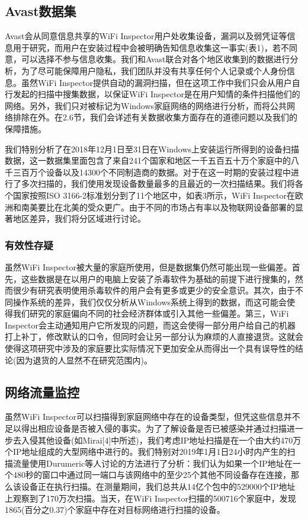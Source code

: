 \documentclass[UTF8]{ctexart}
\begin{document}
	\subsection{Avast数据集}
	Avast会从同意信息共享的WiFi Inspector用户处收集设备，漏洞以及弱凭证等信息用于研究，而用户在安装过程中会被明确告知信息收集这一事实(表1)，若不同意，可以选择不参与信息收集。我们和Avast联合对各个地区收集到的数据进行分析，为了尽可能保障用户隐私，我们团队并没有共享任何个人记录或个人身份信息。虽然WiFi Inspector提供自动的漏洞扫描，但在这项工作中我们只会从用户自行发起的扫描中搜集数据，以保证WiFi Inspector是在用户知情的条件扫描他们的网络。另外，我们只对被标记为Windows家庭网络的网络进行分析，而将公共网络排除在外。在2.6节，我们会详述有关数据收集方面存在的道德问题以及我们的保障措施。
	
	我们特别分析了在2018年12月1日至31日在Windows上安装运行所得到的设备扫描数据，这一数据集里面包含了来自241个国家和地区一千五百五十万个家庭中的八千三百万个设备以及14300个不同制造商的数据。对于在这一时期的安装过程中进行了多次扫描的，我们使用发现设备数量最多的且最近的一次扫描结果。我们将各个国家按照ISO 3166-2标准划分到了11个地区中，如表3所示，WiFi Inspector在欧洲和南美要比在北美的受众更广。由于不同的市场占有率以及物联网设备部署的显著地区差异，我们将分区域进行讨论。
	
	\subsubsection*{有效性存疑}
	虽然WiFi Inspector被大量的家庭所使用，但是数据集仍然可能出现一些偏差。首先，这些数据是在以用户的电脑上安装了杀毒软件为基础的前提下进行搜集的，然而很少有研究表明使用杀毒软件的用户会有更多或更少的安全意识。其次，由于不同操作系统的差异，我们仅仅分析从Windows系统上得到的数据，而这可能会使得我们研究的家庭偏向不同的社会经济群体或引入其他一些偏差。第三，WiFi Inspector会主动通知用户它所发现的问题，而这会使得一部分用户给自己的机器打上补丁，修改默认的口令，但同时会让另一部分认为麻烦的人直接退货。这就会使得这项研究中涉及的家庭要比实际情况下更加安全从而得出一个具有误导性的结论(因为退货的人显然不在研究范围内)。
	
	\subsection{网络流量监控}
	虽然WiFi Inspector可以扫描得到家庭网络中存在的设备类型，但凭这些信息并不足以得出相应设备是否被入侵的事实。为了了解设备是否已被感染并通过扫描进一步去入侵其他设备(如Mirai[4]中所述)，我们考虑IP地址扫描是在一个由大约470万个IP地址组成的大型网络中进行的。我们特别对2019年1月1日24小时内产生的扫描流量使用Durumeric等人讨论的方法进行了分析：我们认为如果一个IP地址在一个480秒的窗口中通过同一端口与该网络中的至少25个其他不同设备存在连接，那么该设备正在执行扫描。在测量期间，我们总共从14亿个包中的529000个IP地址上观察到了170万次扫描。当天，在WiFi Inspector扫描的500716个家庭中，发现1865(百分之0.37)个家庭中存在对目标网络进行扫描的设备。
	
\end{document}
